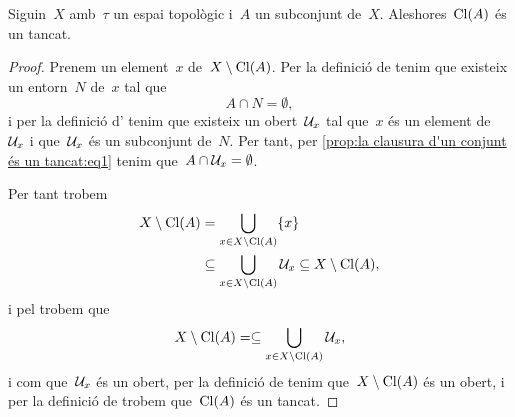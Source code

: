 \documentclass[../../main.tex]{subfiles}
\begin{document}
    \begin{proposition}
        \label{prop:la clausura d'un conjunt és un tancat}
        Siguin~\(X\) amb~\(\tau\) un espai topològic i~\(A\) un subconjunt de~\(X\).
        Aleshores~\(\operatorname{Cl}(A)\) és un tancat.
        \begin{proof}
             Prenem un element~\(x\) de~\(X\setminus\operatorname{Cl}(A)\).
             Per la definició de  tenim que existeix un entorn~\(N\) de~\(x\) tal que
             \begin{equation}
                 \label{prop:la clausura d'un conjunt és un tancat:eq1}
                 A\cap N=\emptyset,
             \end{equation}
             i per la definició d' tenim que existeix un obert~\(\mathcal{U}_{x}\) tal que~\(x\) és un element de~\(\mathcal{U}_{x}\) i que~\(\mathcal{U}_{x}\) és un subconjunt de~\(N\).
             Per tant, per \eqref{prop:la clausura d'un conjunt és un tancat:eq1} tenim que~\(A\cap\mathcal{U}_{x}=\emptyset\).

             Per tant trobem
             \begin{align*}
                 X\setminus\operatorname{Cl}(A)&=\bigcup_{x\in X\setminus\operatorname{Cl}(A)}\{x\} \\
                 &\subseteq\bigcup_{x\in X\setminus\operatorname{Cl}(A)}\mathcal{U}_{x}\subseteq X\setminus\operatorname{Cl}(A),
             \end{align*}
             i pel  trobem que
             \[
                 X\setminus\operatorname{Cl}(A)=\subseteq\bigcup_{x\in X\setminus\operatorname{Cl}(A)}\mathcal{U}_{x},
             \]
             i com que~\(\mathcal{U}_{x}\) és un obert, per la definició de  tenim que~\(X\setminus\operatorname{Cl}(A)\) és un obert, i per la definició de  trobem que~\(\operatorname{Cl}(A)\) és un tancat.
        \end{proof}
    \end{proposition}
\end{document}
